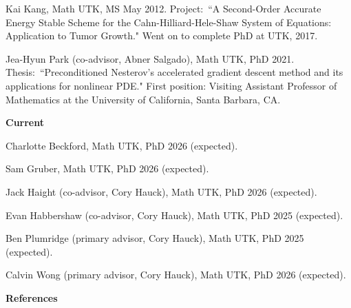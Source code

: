 \documentclass[11pt]{letter}
\begin{document}
\begin{description}
\begin{description}
	\item
Kai Kang, Math UTK, MS May 2012.  Project:~``A Second-Order Accurate Energy Stable Scheme for the Cahn-Hilliard-Hele-Shaw System of Equations: Application to Tumor Growth." Went on to complete PhD at UTK, 2017.

	\item
Jea-Hyun Park (co-advisor, Abner Salgado), Math UTK, PhD 2021.  Thesis:~``Preconditioned Nesterov's accelerated gradient descent method and its applications for nonlinear PDE." First position: Visiting Assistant Professor of Mathematics at the University of California, Santa Barbara, CA.
	\end{description}
	\item
{\Large\bf Current}
	\begin{description}	
	\item
Charlotte Beckford, Math UTK, PhD 2026 (expected).
	\item
Sam Gruber, Math UTK, PhD 2026 (expected).
	\item
Jack Haight (co-advisor, Cory Hauck), Math UTK, PhD 2026 (expected).
	\item
Evan Habbershaw (co-advisor, Cory Hauck), Math UTK, PhD 2025 (expected).
	\item
Ben Plumridge (primary advisor, Cory Hauck), Math UTK, PhD 2025 (expected).
	\item
Calvin Wong (primary advisor, Cory Hauck), Math UTK, PhD 2026 (expected).
	\end{description}

	\end{description}

	\clearpage
	\newpage

{\LARGE\bf  References}
	
\end{document}
